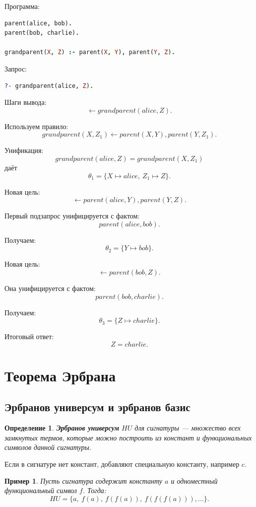 \documentclass[12pt,a4paper]{article}
\newtheorem{definition}{Определение}
\newtheorem{example}{Пример}
\begin{document}
Программа:
\begin{lstlisting}[language=Prolog]
parent(alice, bob).
parent(bob, charlie).

grandparent(X, Z) :- parent(X, Y), parent(Y, Z).
\end{lstlisting}

Запрос:
\begin{lstlisting}[language=Prolog]
?- grandparent(alice, Z).
\end{lstlisting}

Шаги вывода:
$$
\leftarrow grandparent(alice,Z).
$$

Используем правило:
$$
grandparent(X,Z_1) \leftarrow parent(X,Y), parent(Y,Z_1).
$$

Унификация:
$$
grandparent(alice,Z) = grandparent(X,Z_1)
$$
даёт
$$
\theta_1 = \{X \mapsto alice,\ Z_1 \mapsto Z\}.
$$

Новая цель:
$$
\leftarrow parent(alice,Y), parent(Y,Z).
$$

Первый подзапрос унифицируется с фактом:
$$
parent(alice,bob).
$$

Получаем:
$$
\theta_2 = \{Y \mapsto bob\}.
$$

Новая цель:
$$
\leftarrow parent(bob,Z).
$$

Она унифицируется с фактом:
$$
parent(bob,charlie).
$$

Получаем:
$$
\theta_3 = \{Z \mapsto charlie\}.
$$

Итоговый ответ:
$$
Z = charlie.
$$

\section{Теорема Эрбрана}

\subsection{Эрбранов универсум и эрбранов базис}

\begin{definition}
\textbf{Эрбранов универсум} $HU$ для сигнатуры --- множество всех замкнутых термов, которые можно построить из констант и функциональных символов данной сигнатуры.
\end{definition}

Если в сигнатуре нет констант, добавляют специальную константу, например $c$.

\begin{example}
Пусть сигнатура содержит константу $a$ и одноместный функциональный символ $f$.
Тогда:
$$
HU = \{a,\ f(a),\ f(f(a)),\ f(f(f(a))),\dots\}.
$$
\end{example}
\end{document}
